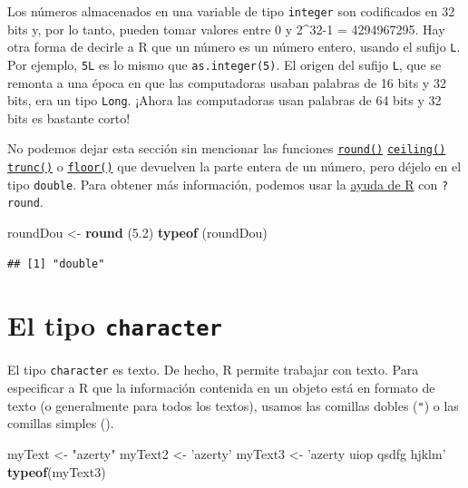 \documentclass[
]{book}
\newenvironment{Shaded}{\begin{snugshade}}{\end{snugshade}}
\newcommand{\FloatTok}[1]{\textcolor[rgb]{0.00,0.00,0.81}{#1}}
\newcommand{\KeywordTok}[1]{\textcolor[rgb]{0.13,0.29,0.53}{\textbf{#1}}}
\newcommand{\NormalTok}[1]{#1}
\newcommand{\StringTok}[1]{\textcolor[rgb]{0.31,0.60,0.02}{#1}}
\begin{document}
Los números almacenados en una variable de tipo \texttt{integer} son codificados en 32 bits y, por lo tanto, pueden tomar valores entre 0 y 2\^{}32-1 = 4294967295. Hay otra forma de decirle a R que un número es un número entero, usando el sufijo \texttt{L}. Por ejemplo, \texttt{5L} es lo mismo que \texttt{as.integer(5)}. El origen del sufijo \texttt{L}, que se remonta a una época en que las computadoras usaban palabras de 16 bits y 32 bits, era un tipo \texttt{Long}. ¡Ahora las computadoras usan palabras de 64 bits y 32 bits es bastante corto!

No podemos dejar esta sección sin mencionar las funciones \protect\hyperlink{l015round}{\texttt{round()}} \protect\hyperlink{l015round}{\texttt{ceiling()}} \protect\hyperlink{l015round}{\texttt{trunc()}} o \protect\hyperlink{l015round}{\texttt{floor()}} que devuelven la parte entera de un número, pero déjelo en el tipo \texttt{double}. Para obtener más información, podemos usar la \protect\hyperlink{l015ayuda}{ayuda de R} con \texttt{?round}.

\begin{Shaded}
\begin{Highlighting}[]
\NormalTok{roundDou <-}\StringTok{ }\KeywordTok{round}\NormalTok{ (}\FloatTok{5.2}\NormalTok{)}
\KeywordTok{typeof}\NormalTok{ (roundDou)}
\end{Highlighting}
\end{Shaded}

\begin{verbatim}
## [1] "double"
\end{verbatim}

\hypertarget{el-tipo-character}{%
\section{\texorpdfstring{El tipo \texttt{character}}{El tipo character}}\label{el-tipo-character}}

El tipo \texttt{character} es texto. De hecho, R permite trabajar con texto. Para especificar a R que la información contenida en un objeto está en formato de texto (o generalmente para todos los textos), usamos las comillas dobles (\texttt{"}) o las comillas simples (\texttt{\textquotesingle{}}).

\begin{Shaded}
\begin{Highlighting}[]
\NormalTok{myText <-}\StringTok{ "azerty"}
\NormalTok{myText2 <-}\StringTok{ 'azerty'}
\NormalTok{myText3 <-}\StringTok{ 'azerty uiop qsdfg hjklm'}
\KeywordTok{typeof}\NormalTok{(myText3)}
\end{Highlighting}
\end{Shaded}
\end{document}
